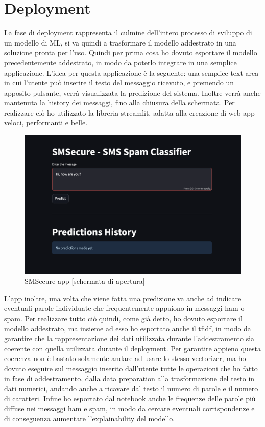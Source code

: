 \documentclass[]{article}
\begin{document}
        \newpage
        \section{Deployment}
            La fase di deployment rappresenta il culmine dell'intero processo di sviluppo di un modello di ML, si va quindi a trasformare il modello addestrato in una soluzione pronta per l'uso. Quindi per prima cosa ho dovuto esportare il modello precedentemente addestrato, in modo da poterlo integrare in una semplice applicazione. L'idea per questa applicazione è la seguente: una semplice text area in cui l'utente può inserire il testo del messaggio ricevuto, e premendo un apposito pulsante, verrà visualizzata la predizione del sistema. Inoltre verrà anche mantenuta la history dei messaggi, fino alla chiusura della schermata. Per realizzare ciò ho utilizzato la libreria streamlit, adatta alla creazione di web app veloci, performanti e belle.
            \begin{figure}[H]
                \centering
                \includegraphics[width=0.6\linewidth]{images/app.png}
                \caption{SMSecure app [schermata di apertura]}
                \label{fig:enter-label}
            \end{figure}
            L'app inoltre, una volta che viene fatta una predizione va anche ad indicare eventuali parole individuate che frequentemente appaiono in messaggi ham o spam.
            Per realizzare tutto ciò quindi, come già detto, ho dovuto esportare il modello addestrato, ma insieme ad esso ho esportato anche il tfidf, in modo da garantire che la rappresentazione dei dati utilizzata durante l'addestramento sia coerente con quella utilizzata durante il deployment. Per garantire appieno questa coerenza non è bastato solamente andare ad usare lo stesso vectorizer, ma ho dovuto eseguire sul messaggio inserito dall'utente tutte le operazioni che ho fatto in fase di addestramento, dalla data preparation alla trasformazione del testo in dati numerici, andando anche a ricavare dal testo il numero di parole e il numero di caratteri. Infine ho esportato dal notebook anche le frequenze delle parole più diffuse nei messaggi ham e spam, in modo da cercare eventuali corrispondenze e di conseguenza aumentare l'explainability del modello.
\end{document}
